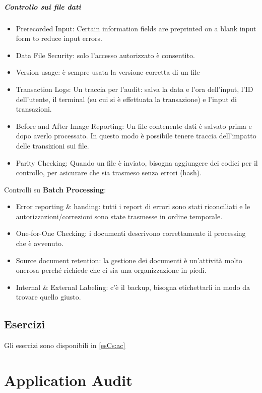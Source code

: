 \paragraph{Controllo sui file dati}
\begin{itemize}
\item
Prerecorded Input: Certain information fields are preprinted on a blank
input form to reduce input errors.
\item
Data File Security: solo l'accesso autorizzato è consentito.
\item
Version usage: è sempre usata la versione corretta di un file
\item
Transaction Logs: Un traccia per l'audit: salva la data e l'ora dell'input,
l'ID dell'utente, il terminal (su cui si è effettuata la transazione) e
l'input di transazioni.
\item
Before and After Image Reporting: Un file contenente dati è salvato
prima e dopo averlo processato. In questo modo è possibile tenere traccia
dell'impatto delle transizioni sui file.
\item 
Parity Checking: Quando un file è inviato, bisogna aggiungere dei codici
per il controllo, per asicurare che sia trasmeso senza errori (hash).
\end{itemize}

Controlli su \textbf{Batch Processing}:
\begin{itemize}
\item
Error reporting \& handing: tutti i report di errori sono stati riconciliati
e le autorizzazioni/correzioni sono state trasmesse in ordine temporale.
\item
One-for-One Checking: i documenti descrivono correttamente il processing
che è avvenuto.
\item
Source document retention: la gestione dei documenti è un'attività molto
onerosa perché richiede che ci sia una organizzazione in piedi.
\item
Internal \& External Labeling: c'è il backup, bisogna etichettarli in 
modo da trovare quello giusto.
\end{itemize}





\section{Esercizi}

Gli esercizi sono disponibili in \ref{esCs:ac}

\chapter{Application Audit}
\label{cs:aa}

